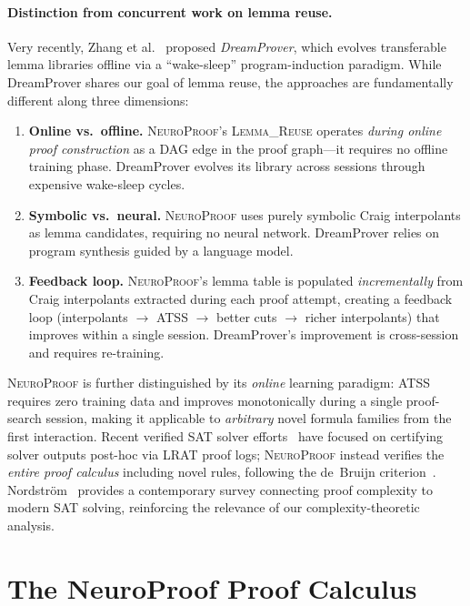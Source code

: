 \documentclass[conference]{IEEEtran}
\newcommand{\NP}{\textsc{NeuroProof}}
\newcommand{\ATSS}{\textsc{ATSS}}
\begin{document}
\paragraph{Distinction from concurrent work on lemma reuse.}
Very recently, Zhang et al.~\cite{DreamProver2026} proposed
\emph{DreamProver}, which evolves transferable lemma libraries
offline via a ``wake-sleep'' program-induction paradigm.
While DreamProver shares our goal of lemma reuse, the approaches
are fundamentally different along three dimensions:
\begin{enumerate}
  \item \textbf{Online vs.\ offline.}  \NP{}'s \textsc{Lemma\_Reuse}
    operates \emph{during online proof construction} as a DAG edge in
    the proof graph---it requires no offline training phase.  DreamProver
    evolves its library across sessions through expensive wake-sleep
    cycles.
  \item \textbf{Symbolic vs.\ neural.}  \NP{} uses purely symbolic
    Craig interpolants as lemma candidates, requiring no neural network.
    DreamProver relies on program synthesis guided by a language model.
  \item \textbf{Feedback loop.}  \NP{}'s lemma table is populated
    \emph{incrementally} from Craig interpolants extracted during each
    proof attempt, creating a feedback loop (interpolants $\to$ ATSS
    $\to$ better cuts $\to$ richer interpolants) that improves
    within a single session.  DreamProver's improvement is
    cross-session and requires re-training.
\end{enumerate}

\noindent
\NP{} is further distinguished by its \emph{online} learning paradigm:
\ATSS{} requires zero training data and improves monotonically during
a single proof-search session, making it applicable to \emph{arbitrary}
novel formula families from the first interaction.  Recent verified
SAT solver efforts~\cite{LammichLRAT2024,FleuryVerifiedSAT2025}
have focused on certifying solver outputs post-hoc via LRAT proof
logs; \NP{} instead verifies the \emph{entire proof calculus}
including novel rules, following the de~Bruijn
criterion~\cite{Harrison2009}.  Nordstr\"{o}m~\cite{NordstromProofComplexity2025}
provides a contemporary survey connecting proof complexity to modern
SAT solving, reinforcing the relevance of our complexity-theoretic
analysis.

\section{The NeuroProof Proof Calculus}
\label{sec:system}
\end{document}
